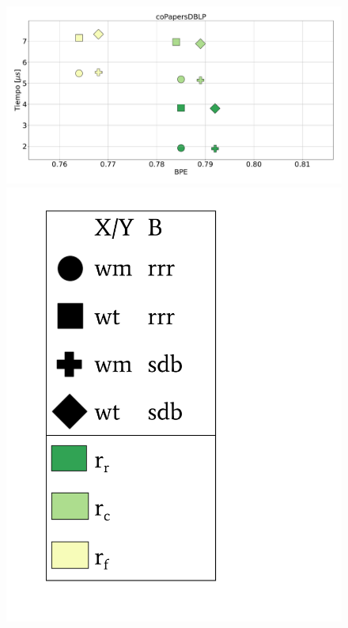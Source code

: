 \begin{figure}
    	\centering
    	\begin{minipage}{1\textwidth}
    			\centering
    			\begin{minipage}{0.8\textwidth}
    				\centering
    				\includegraphics[width=1\linewidth]{img/sdsl/aleatorioBig/coPapersDBLP.pdf}
    			\end{minipage}
    			\begin{minipage}{0.15\textwidth}
    				\centering
    				\includegraphics[scale=.22, clip, trim=70 0 0 0]{img/sdsl/label.pdf}
    			\end{minipage}
    			

\end{minipage}
\end{figure}
